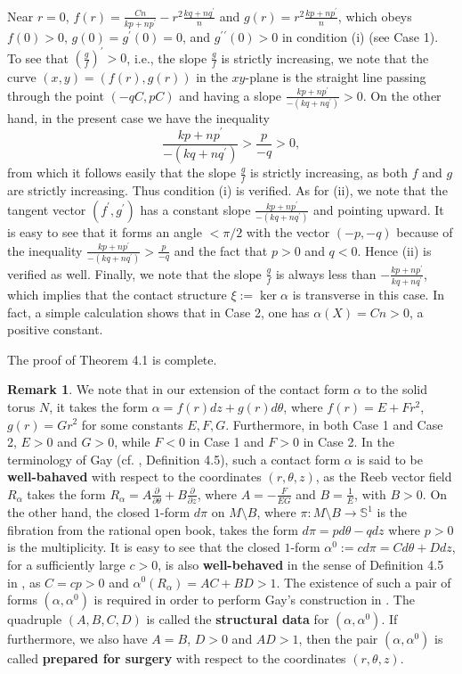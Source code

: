 \documentclass[11pt]{amsart}
\theoremstyle{plain}
\numberwithin{theorem}{section}
\theoremstyle{definition}
\newtheorem{remark}[theorem]{Remark}
\newcommand{\s}{{\mathbb S}}
\begin{document}
Near $r=0$, $f(r)=\frac{Cn}{kp+np^\prime}-r^2 \frac{kq+nq^\prime}{n}$ and 
$g(r)=r^2\frac{kp+np^\prime}{n}$, which obeys $f(0)>0$, $g(0)=g^\prime(0)=0$, and $g^\prime{^\prime}(0)>0$ in condition (i) (see Case 1). To see that $(\frac{g}{f})^\prime>0$, i.e., the slope $\frac{g}{f}$ is strictly increasing, we note that the curve $(x,y)=(f(r),g(r))$ in the $xy$-plane is the straight line 
passing through the point $(-qC,pC)$ and having a slope $\frac{kp+np^\prime}{-(kq+nq^\prime)}>0$. 
On the other hand, in the present case we have the inequality 
$$
\frac{kp+np^\prime}{-(kq+nq^\prime)}>\frac{p}{-q}>0,
$$
from which it follows easily that the slope $\frac{g}{f}$ is strictly increasing, as both
$f$ and $g$ are strictly increasing. Thus condition (i) is verified. As for (ii), we note that the
tangent vector $(f^\prime,g^\prime)$ has a constant slope $\frac{kp+np^\prime}{-(kq+nq^\prime)}$
and pointing upward. It is easy to see that it forms an angle $<\pi/2$ with the vector $(-p,-q)$
because of the inequality $\frac{kp+np^\prime}{-(kq+nq^\prime)}>\frac{p}{-q}$ and the fact that
$p>0$ and $q<0$. Hence (ii) is verified as well. Finally, we note that the slope $\frac{g}{f}$ is always 
less than $-\frac{kp+np^\prime}{kq+nq^\prime}$, which implies that the contact structure 
$\xi:=\ker\alpha$ is transverse in this case. In fact, a simple calculation shows that in Case 2,
one has $\alpha(X)=Cn>0$, a positive constant. 

The proof of Theorem 4.1 is complete. 

\begin{remark}
We note that in our extension of the contact form $\alpha$ to the solid torus $N$, it takes the form 
$\alpha=f(r)dz+g(r)d\theta$, where $f(r)=E+Fr^2$, $g(r)=Gr^2$ for some constants $E,F,G$. Furthermore, 
in both Case 1 and Case 2, $E>0$ and $G>0$, while $F<0$ in Case 1 and $F>0$ in Case 2. 
In the terminology of Gay (cf. \cite{G}, Definition 4.5), such a contact form $\alpha$ is said to be {\bf well-bahaved} with respect to the coordinates $(r,\theta,z)$, as the Reeb vector field $R_\alpha$ takes the form
$R_\alpha=A\frac{\partial}{\partial \theta}+B\frac{\partial}{\partial z}$, where $A=-\frac{F}{EG}$ and 
$B=\frac{1}{E}$, with $B>0$. On the other hand, the closed $1$-form $d\pi$ on $M\setminus  B$, where $\pi: M\setminus B\rightarrow \s^1$ is the fibration from the rational open book, takes the form $d\pi=p d\theta-qd z$ where $p>0$ is the multiplicity. It is easy to see that the closed $1$-form $\alpha^0:=cd\pi=C d\theta+D dz$, for a sufficiently large $c>0$, is also {\bf well-behaved} in the sense of Definition 4.5 in \cite{G}, as $C=cp>0$ and 
$\alpha^0(R_\alpha)=AC+BD>1$. The existence of such a pair of forms $(\alpha,\alpha^0)$ is
required in order to perform Gay's construction in \cite{G}. The quadruple $(A,B,C,D)$ is called the {\bf structural data} for $(\alpha,\alpha^0)$. If furthermore, we also have $A=B$, $D>0$ and $AD>1$, then the pair 
$(\alpha,\alpha^0)$ is called {\bf prepared for surgery} with respect to the coordinates $(r,\theta,z)$. 
\end{remark}
\end{document}
